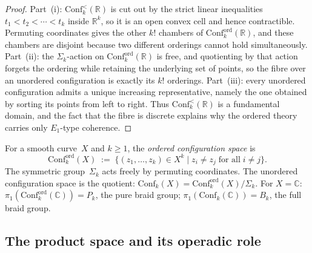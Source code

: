 \begin{proof}
Part~\textup{(i)}: $\mathrm{Conf}_k^{<}(\mathbb R)$ is cut out by the
strict linear inequalities
$t_1<t_2<\cdots<t_k$ inside $\mathbb R^k$, so it is an open convex
cell and hence contractible.
Permuting coordinates gives the other $k!$ chambers of
$\mathrm{Conf}_k^{\mathrm{ord}}(\mathbb R)$, and these chambers are
disjoint because two different orderings cannot hold simultaneously.
Part~\textup{(ii)}: the $\Sigma_k$-action on
$\mathrm{Conf}_k^{\mathrm{ord}}(\mathbb R)$ is free, and quotienting by
that action forgets the ordering while retaining the underlying set of
points, so the fibre over an unordered configuration is exactly its
$k!$ orderings.
Part~\textup{(iii)}: every unordered configuration admits a unique
increasing representative, namely the one obtained by sorting its
points from left to right.
Thus $\mathrm{Conf}_k^{<}(\mathbb R)$ is a fundamental domain, and the
fact that the fibre is discrete explains why the ordered theory carries
only $E_1$-type coherence.
\end{proof}

\begin{definition}
\label{def:ordered-hol-config}
For a smooth curve~$X$ and $k\ge 1$, the \emph{ordered
configuration space} is
\[
\mathrm{Conf}_k^{\mathrm{ord}}(X)
\;:=\;
\bigl\{(z_1,\dots,z_k)\in X^k
\;\big|\;
z_i\neq z_j\;\text{for all}\;i\neq j\bigr\}.
\]
The symmetric group~$\Sigma_k$ acts freely by permuting
coordinates. The unordered configuration space is the
quotient:
$\mathrm{Conf}_k(X)
=\mathrm{Conf}_k^{\mathrm{ord}}(X)/\Sigma_k$.
For $X=\mathbb C$:
$\pi_1(\mathrm{Conf}_k^{\mathrm{ord}}(\mathbb C))=P_k$,
the pure braid group;
$\pi_1(\mathrm{Conf}_k(\mathbb C))=B_k$,
the full braid group.
\end{definition}

\subsection{The product space and its operadic role}
\label{subsec:product-space}

